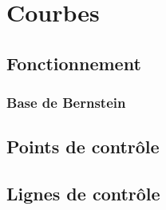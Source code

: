 \chapter{Courbes}

\section{Fonctionnement}

\subsection{Base de Bernstein}

\section{Points de contrôle}

\section{Lignes de contrôle}


